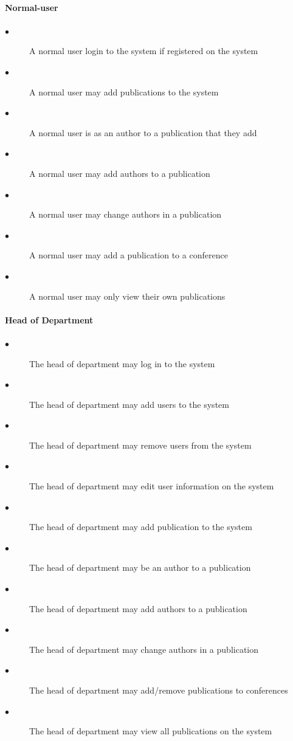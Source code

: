 \documentclass[a4paper]{article}
\begin{document}
	\paragraph{\textbf{Normal-user}}
	\begin{description}
		\item[$\bullet$] A normal user login to the system if registered on the system
		\item[$\bullet$] A normal user may add publications to the system
		\item[$\bullet$] A normal user is as an author to a publication that they add
		\item[$\bullet$] A normal user may add authors to a publication
		\item[$\bullet$] A normal user may change authors in a publication
		\item[$\bullet$] A normal user may add a publication to a conference
		\item[$\bullet$] A normal user may only view their own publications
	\end{description}
	\paragraph{\textbf{Head of Department}}
	\begin{description}
		\item[$\bullet$] The head of department may log in to the system
		\item[$\bullet$] The head of department may add users to the system
		\item[$\bullet$] The head of department may remove users from the system
		\item[$\bullet$] The head of department may edit user information on the system
		\item[$\bullet$] The head of department may add publication to the system
		\item[$\bullet$] The head of department may be an author to a publication
		\item[$\bullet$] The head of department may add authors to a publication
		\item[$\bullet$] The head of department may change authors in a publication
		\item[$\bullet$] The head of department may add/remove publications to conferences
		\item[$\bullet$] The head of department may view all publications on the system
	\end{description}
\end{document}
